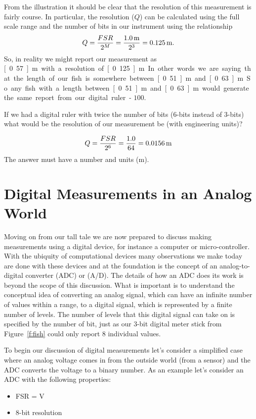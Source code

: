 From the illustration it should be clear that the resolution of this measurement is fairly course.  In particular, the resolution ($Q$) can be calculated using the full scale range and the number of bits in our instrument using the relationship
\begin{equation}
Q = \frac{FSR}{2^M} = \frac{\unit[1.0]{m}}{2^3} = \unit[0.125]{m}.
\end{equation}
So, in reality we might report our measurement as \unit[0.57]{m} with a resolution of  \unit[0.125]{m}.  In other words we are saying that the length of our fish is somewhere between \unit[0.51]{m} and \unit[0.63]{m}.  So any fish with a length between \unit[0.51]{m} and \unit[0.63]{m} would generate the same report from our digital ruler - $100$.

\begin{ex}
If we had a digital ruler with twice the number of bits (6-bits instead of 3-bits) what would be the resolution of our measurement be (with engineering units)?
\end{ex}

\ifsolutions
\begin{soln}
\[
Q = \frac{FSR}{2^6} = \frac{1.0}{64} = \unit[0.0156]{m}
\]
The answer must have a number and units (m).
\end{soln}
\fi


\section{Digital Measurements in an Analog World}
\label{s:dac}
Moving on from our tall tale we are now prepared to discuss making measurements using a digital device, for instance a computer or micro-controller.  With the ubiquity of computational devices many observations we make today are done with these devices and at the foundation is the concept of an \gls{analog-to-digital converter} (ADC) or (A/D).  The details of how an ADC does its work is beyond the scope of this discussion.  What is important is to understand the conceptual idea of converting an analog signal, which can have an infinite number of values within a range, to a digital signal, which is represented by a finite number of levels.  The number of levels that this digital signal can take on is specified by the number of bit, just as our 3-bit digital meter stick from Figure~\ref{f:fish} could only report 8 individual values.  

To begin our discussion of digital measurements let's consider a simplified case where an analog voltage comes in from the outside world (from a sensor) and the ADC converts the voltage to a binary number.  As an example let's consider an ADC with the following properties:
\begin{itemize}
\item FSR = \unit[0--10]{V}
\item 8-bit resolution
\end{itemize}

